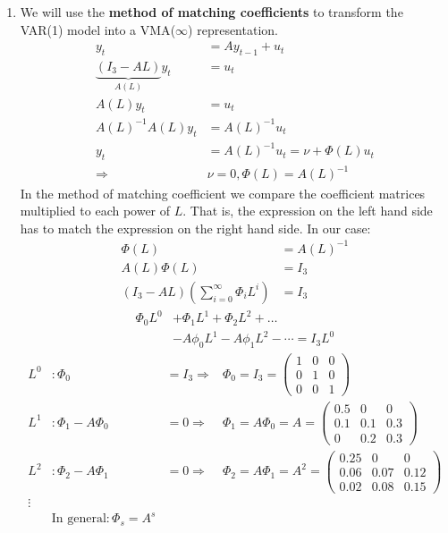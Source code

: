 \begin{enumerate}
\item We will use the \textbf{method of matching coefficients} to transform the VAR{(1)} model into a VMA{(\(\infty \))} representation.
\begin{align*}
y_t &= A y_{t-1} + u_t
\\
\underbrace{(I_3 - A L)}_{A(L)} y_t &= u_t
\\
A(L) y_t &= u_t
\\
{A(L)}^{-1}A(L) y_t &= {A(L)}^{-1} u_t
\\
y_t &= {A(L)}^{-1} u_t = \nu + \Phi(L) u_t
\\
\Rightarrow & \nu= 0, \Phi(L) = {A(L)}^{-1}
\end{align*}
In the method of matching coefficient we compare the coefficient matrices multiplied to each power of \(L\).
That is, the expression on the left hand side has to match the expression on the right hand side.
In our case:
\begin{align*}
\Phi(L) &= {A(L)}^{-1}
\\
A(L) \Phi(L) &= I_3
\\
(I_3 - A L) \left(\sum_{i=0}^\infty \Phi_i L^i\right) &= I_3
\end{align*}
\begin{align*}
\Phi_0 L^0 &+ \Phi_1 L^1 + \Phi_2 L^2 + \dots
\\
& - A \phi_0 L^1 - A \phi_1 L^2 - \cdots = I_3 L^0
\end{align*}
\begin{align*}
L^0&: \Phi_0 &= I_3 \Rightarrow& \Phi_0 = I_3 = \begin{pmatrix} 1 & 0 & 0 \\ 0 & 1 & 0 \\ 0 & 0 & 1 \end{pmatrix}\nonumber
\\
L^1&: \Phi_1 - A \Phi_0 &= 0 \Rightarrow& \Phi_1 = A \Phi_0 = A = \begin{pmatrix} 0.5 & 0 & 0 \\ 0.1 & 0.1 & 0.3 \\ 0 & 0.2 & 0.3 \end{pmatrix}\nonumber
\\
L^2&: \Phi_2 - A \Phi_1 &= 0 \Rightarrow& \Phi_2 = A \Phi_1 = A^2 = \begin{pmatrix} 0.25 & 0 & 0 \\ 0.06 & 0.07 & 0.12 \\ 0.02 & 0.08 & 0.15 \end{pmatrix}\nonumber
\\
\vdots\nonumber
\\
&\text{In general}: \Phi_s = A^s
\end{align*}
\end{enumerate}